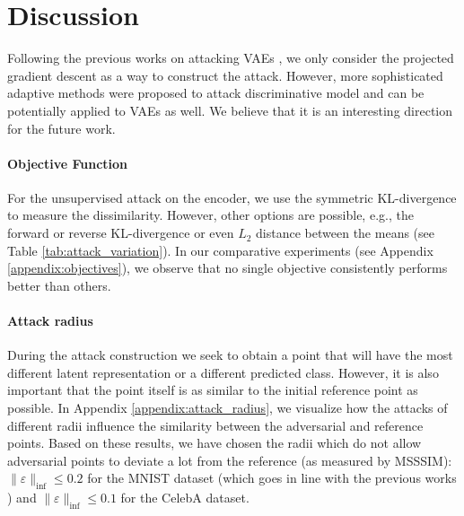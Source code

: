 



\section{Discussion}
Following the previous works on attacking VAEs \cite{barrett2021certifiably, camuto2021towards, cemgil2020autoencoding, Cemgil2019-vn, Gondim-Ribeiro2018-cu, Willetts2019-mu}, we only consider the projected gradient descent as a way to construct the attack. However, more sophisticated adaptive methods \cite{ athalye2018obfuscated, tramer2020adaptive} were proposed to attack discriminative model and can be potentially applied to VAEs as well.
We believe that it is an interesting direction for the future work. 

\paragraph{Objective Function}
For the unsupervised attack on the encoder, we use the symmetric KL-divergence to measure the dissimilarity. However, other options are possible, e.g., the forward or reverse KL-divergence or even $L_2$ distance between the means (see Table \ref{tab:attack_variation}). In our comparative experiments (see Appendix \ref{appendix:objectives}), we observe that no single objective consistently performs better than others.


\paragraph{Attack radius}
During the attack construction we seek to obtain a point that will have the most different latent representation or a different predicted class. However, it is also important that the point itself is as similar to the initial reference point as possible. In Appendix \ref{appendix:attack_radius}, we visualize how the attacks of different radii influence the similarity between the adversarial and reference points. Based on these results, we have chosen the radii which do not allow adversarial points to deviate a lot from the reference (as measured by \textsc{MSSSIM}): $\|\varepsilon\|_{\inf} \leq 0.2$ for the MNIST dataset (which goes in line with the previous works \cite{cemgil2020autoencoding, Cemgil2019-vn}) and $\|\varepsilon\|_{\inf} \leq 0.1$ for the CelebA dataset. 


